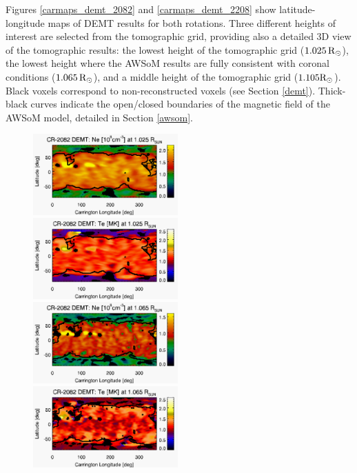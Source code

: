 \documentclass[namedreferences]{solarphysics}
\newcommand{\mrsun}{{\rm R_\odot}}
\begin{document}
\begin{article}
Figures \ref{carmaps_demt_2082} and \ref{carmaps_demt_2208} show {latitude-longitude} maps of DEMT results for both {rotations. Three different heights {of interest are selected from the tomographic grid}, providing also a detailed 3D view of the tomographic results: the lowest height of {the} tomographic grid ($1.025\,\mrsun$), {the lowest height where the AWSoM results are fully} consistent with coronal conditions ($1.065\,\mrsun$), and a middle height of the tomographic grid ($1.105\mrsun$)}. Black voxels correspond to non-reconstructed voxels ({see} Section \ref{demt}). Thick-black {curves indicate} the {open/closed boundaries of the magnetic field of the} AWSoM model{, detailed in Section \ref{awsom}.} 

\begin{figure}[h!]
\begin{center}
\includegraphics[width=0.495\textwidth]{figs/map_Ne_CR2082_DEMT-EUVI_behind_H1-L3523_r3d_1025_Rsun.pdf}
\includegraphics[width=0.495\textwidth]{figs/map_Tm_CR2082_DEMT-EUVI_behind_H1-L3523_r3d_1025_Rsun.pdf}
\includegraphics[width=0.495\textwidth]{figs/map_Ne_CR2082_DEMT-EUVI_behind_H1-L3523_r3d_1065_Rsun.pdf}
\includegraphics[width=0.495\textwidth]{figs/map_Tm_CR2082_DEMT-EUVI_behind_H1-L3523_r3d_1065_Rsun.pdf}

\end{center}
\end{figure}
\end{article}
\end{document}
